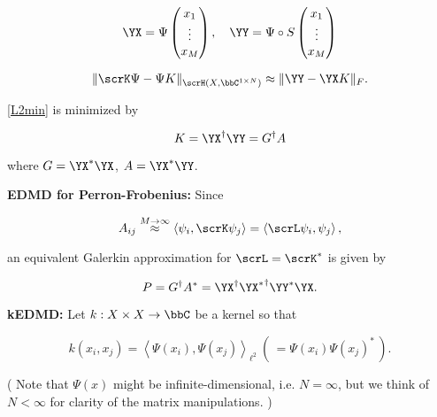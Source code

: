 \begin{equation}
    \YX = \Psi 
        \begin{pmatrix}
            x_1 \\
            \vdots \\
            x_M
        \end{pmatrix}
    , \quad
    \YY = \Psi \circ S 
        \begin{pmatrix}
            x_1 \\
            \vdots \\
            x_M
        \end{pmatrix}
\end{equation}

\begin{equation}
    \label{l2min}
    \| \scrK \Psi - \Psi K \|_{\scrH (X, \bbC^{1 \times N})}
    \approx
    \| \YY - \YX K \|_F . 
\end{equation}

\ref{L2min} is minimized by 

\begin{equation}
    K = \YX^\dagger \YY = G^\dagger A
\end{equation}

where $G = \YX^* \YX$, $A = \YX^* \YY$. 

\textbf{EDMD for Perron-Frobenius:} Since

\begin{equation}
    A_{i j} \stackrel{M \to \infty}{\approx} \left\langle \psi_i, \scrK \psi_j 
    \right\rangle = 
    \left\langle \scrL \psi_i, \psi_j \right\rangle, 
\end{equation}

an equivalent Galerkin approximation for $\scrL = \scrK^*$ is given by

\begin{equation}
    P = G^\dagger A^* = \YX^\dagger {\YX^*}^\dagger \YY^* \YX . 
\end{equation}

\textbf{kEDMD:} Let $k : X \times X \to \bbC$ be a kernel so that 

\begin{equation}
    k(x_i, x_j) = \left\langle \Psi (x_i), \Psi (x_j) \right\rangle_{\ell^2}\ \left(\, = 
    \Psi (x_i) \Psi (x_j)^* \,\right) .
\end{equation}

( Note that $\Psi (x)$ might be infinite-dimensional, i.e. $N = \infty$, but we think of 
$N < \infty$ for clarity of the matrix manipulations. )

